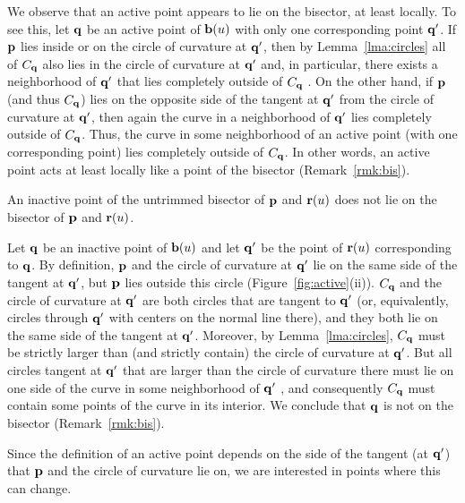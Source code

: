 \begin{rmk}
\label{r:active}
{\rm
We observe that an active point appears to lie on the bisector, at least
locally. To see this, let ${\bf q}$ be an active point of ${\bf b}(u)$
with only one corresponding point ${\bf q}'$. If ${\bf p}$ lies inside or
on the circle of curvature at ${\bf q}'$, then by Lemma~\ref{lma:circles}
all of $C_{\bf q}$ also lies in the circle of curvature at ${\bf q}'$ and,
in particular, there exists a neighborhood of ${\bf q}'$
that lies completely outside of $C_{\bf q}$ \cite[p.~176]{H52}.
On the other hand, if ${\bf p}$ (and thus $C_{\bf q}$) lies on the opposite side
of the tangent at ${\bf q}'$ from the circle of curvature at ${\bf q}'$,
then again the curve in a neighborhood of ${\bf q}'$ lies completely outside of
$C_{\bf q}$.
Thus, the curve in some neighborhood of an active point (with one corresponding
point) lies completely outside of $C_{\bf q}$.
In other words, an active point acts at least locally
like a point of the bisector (Remark~\ref{rmk:bis}).
}
\end{rmk}

\begin{propn}
An inactive point of the untrimmed bisector of ${\bf p}$ and ${\bf r}(u)$
does not lie on the bisector of ${\bf p}$ and ${\bf r}(u)$.
\end{propn}
\prf
Let ${\bf q}$ be an inactive point of ${\bf b}(u)$ and let ${\bf q}'$
be the point of ${\bf r}(u)$ corresponding to ${\bf q}$. By definition,
${\bf p}$ and the circle of curvature at ${\bf q}'$ lie on the same side
of the tangent at ${\bf q}'$, but ${\bf p}$ lies outside this circle
(Figure~\ref{fig:active}(ii)). $C_{\bf q}$ and the circle of curvature
at ${\bf q}'$ are both circles that are tangent to ${\bf q}'$ (or,
equivalently, circles through ${\bf q}'$ with centers on the normal
line there), and they both lie on the same side of the tangent at
${\bf q}'$. Moreover, by Lemma~\ref{lma:circles}, $C_{\bf q}$ must
be strictly larger than (and strictly contain) the circle of curvature
at ${\bf q}'$. But all circles tangent at ${\bf q}'$ that are larger
than the circle of curvature there must lie on one side of the curve
in some neighborhood of ${\bf q}'$ \cite[p.~176]{H52}, and consequently
$C_{\bf q}$ must contain some points of the curve in its interior. We
conclude that ${\bf q}$ is not on the bisector (Remark~\ref{rmk:bis}).
\QED

Since the definition of an active point depends on the side of the
tangent (at ${\bf q}'$) that ${\bf p}$ and the circle of curvature lie
on, we are interested in points where this can change.

